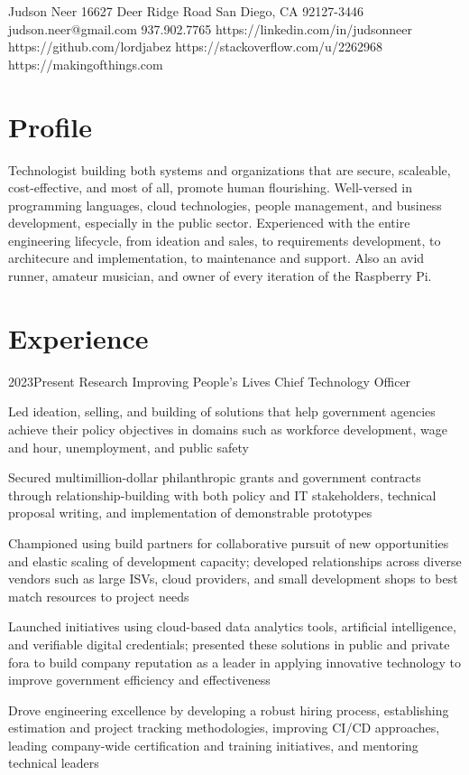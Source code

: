 \documentclass{article}
\begin{document}
\header
  {Judson Neer}
  {16627 Deer Ridge Road}
  {San Diego, CA 92127-3446}
  {judson.neer@gmail.com}
  {937.902.7765}
  {https://linkedin.com/in/judsonneer}
  {https://github.com/lordjabez}
  {https://stackoverflow.com/u/2262968}
  {https://makingofthings.com}


\section{Profile}

Technologist building both systems and organizations that are secure, scaleable, cost-effective, and most of all, promote human flourishing. Well-versed in programming languages, cloud technologies, people management, and business development, especially in the public sector. Experienced with the entire engineering lifecycle, from ideation and sales, to requirements development, to architecure and implementation, to maintenance and support. Also an avid runner, amateur musician, and owner of every iteration of the Raspberry Pi.


\section{Experience}

\job
  {2023}{Present}
  {Research Improving People's Lives}
  {Chief Technology Officer}
  {\begin{achievements}
    \item Led ideation, selling, and building of solutions that help government agencies achieve their policy objectives in domains such as workforce development, wage and hour, unemployment, and public safety
    \item Secured multimillion-dollar philanthropic grants and government contracts through relationship-building with both policy and IT stakeholders, technical proposal writing, and implementation of demonstrable prototypes
    \item Championed using build partners for collaborative pursuit of new opportunities and elastic scaling of development capacity; developed relationships across diverse vendors such as large ISVs, cloud providers, and small development shops to best match resources to project needs
    \item Launched initiatives using cloud-based data analytics tools, artificial intelligence, and verifiable digital credentials; presented these solutions in public and private fora to build company reputation as a leader in applying innovative technology to improve government efficiency and effectiveness
    \item Drove engineering excellence by developing a robust hiring process, establishing estimation and project tracking methodologies, improving CI/CD approaches, leading company-wide certification and training initiatives, and mentoring technical leaders
  \end{achievements}}
\end{document}
